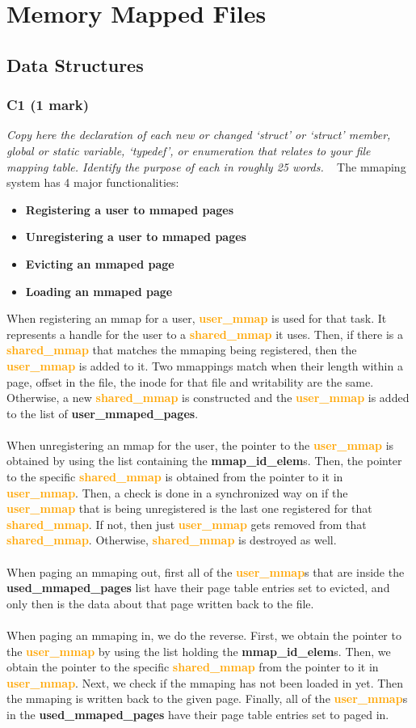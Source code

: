 \documentclass{report}
\newcommand{\question}[1]{\textit{#1} \ }
\newcommand{\bullpara}[2]{\item \textbf{#1} \ #2}
\newcommand{\struct}[1]{\textcolor{orange}{\textbf{#1}}}
\newcommand{\var}[1]{\textcolor{RoyalPurple}{\textbf{#1}}}
\newcommand{\compitem}[1]{\begin{itemize}\setlength\itemsep{-0.1em}#1\end{itemize}}
\begin{document}
	\section*{Memory Mapped Files}
		\subsection*{Data Structures}
			\subsubsection*{C1 (1 mark)}
				\question{Copy here the declaration of each new or changed `struct' or 
				`struct' member, global or static variable, `typedef', or 
				enumeration that relates to your file mapping table. Identify 
				the purpose of each in roughly 25 words.}
				The mmaping system has 4 major functionalities:
				\compitem{
					\bullpara{Registering a user to mmaped pages}{}
					\bullpara{Unregistering a user to mmaped pages}{}
					\bullpara{Evicting an mmaped page}{}
					\bullpara{Loading an mmaped page}{}
				}
				When registering an mmap for a user, \struct{user\_mmap} is used
				for that task. It represents a handle for the user to a \struct{shared\_mmap}
				it uses. Then, if there is a \struct{shared\_mmap} that matches the mmaping being registered,
				then the \struct{user\_mmap} is added to it. Two mmappings match when their length within a page, offset in 
				the file, the inode for that file and writability are the same. Otherwise, a new 
				\struct{shared\_mmap} is constructed and the \struct{user\_mmap} is added to the list of \var{user\_mmaped\_pages}.
				\\
				\\ When unregistering an mmap for the user, the pointer to the \struct{user\_mmap} is obtained
				by using the list containing the \var{mmap\_id\_elem}s. Then, the pointer to the specific \struct{shared\_mmap}
				is obtained from the pointer to it in \struct{user\_mmap}. Then, a check is done in a synchronized way on if
				the \struct{user\_mmap} that is being unregistered is the last one registered for that \struct{shared\_mmap}. If not,
				then just \struct{user\_mmap} gets removed from that \struct{shared\_mmap}. Otherwise, \struct{shared\_mmap} is destroyed as well.
				\\
				\\ When paging an mmaping out, first all of the \struct{user\_mmap}s that are inside the \var{used\_mmaped\_pages} list have their
				page table entries set to evicted, and only then is the data about that page written back to the file.
				\\
				\\ When paging an mmaping in, we do the reverse.
				First, we obtain the pointer to the \struct{user\_mmap}
				by using the list holding the \var{mmap\_id\_elem}s. Then, we obtain the pointer to the specific \struct{shared\_mmap}
				from the pointer to it in \struct{user\_mmap}. Next, we check if 
				the mmaping has not been loaded in yet. Then the mmaping is written back to the given page. 
				Finally, all of the \struct{user\_mmap}s in the \var{used\_mmaped\_pages} have their page table entries set to paged in.
				
\end{document}
